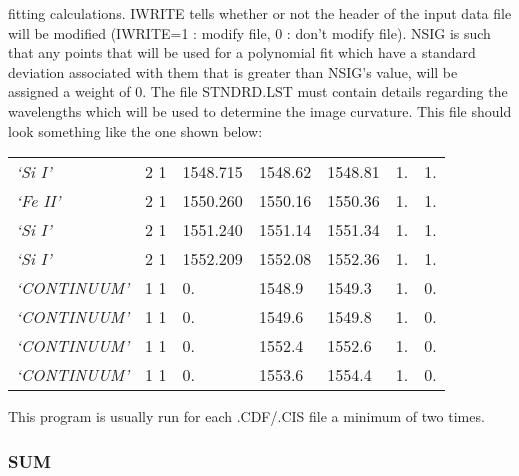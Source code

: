    fitting calculations.  IWRITE tells whether or not the header of the
   input data file will be modified (IWRITE=1 : modify file, 0 : don't
   modify file).  NSIG is such that any points that will be used for a
   polynomial fit which have a standard deviation associated with them
   that is greater than NSIG's value, will be assigned a weight of 0.
      The file STNDRD.LST must contain details regarding the wavelengths
   which will be used to determine the image curvature.  This file should
   look something like the one shown below:
\begin{center}
\begin{tabular}{||l l l l l l l||}
\hline
    {\em `Si I'}      &  2 1 & 1548.715 &  1548.62 &  1548.81 &   1.&   1. \\
    {\em `Fe II'}     &  2 1 & 1550.260 &  1550.16 &  1550.36 &   1.&   1. \\
    {\em `Si I'}      &  2 1 & 1551.240 &  1551.14 &  1551.34 &   1.&   1. \\
    {\em `Si I'}      &  2 1 & 1552.209 &  1552.08 &  1552.36 &   1.&   1. \\
    {\em `CONTINUUM'} &  1 1 &    0.    &  1548.9  &  1549.3  &   1.&   0. \\
    {\em `CONTINUUM'} &  1 1 &    0.    &  1549.6  &  1549.8  &   1.&   0. \\
    {\em `CONTINUUM'} &  1 1 &    0.    &  1552.4  &  1552.6  &   1.&   0. \\
    {\em `CONTINUUM'} &  1 1 &    0.    &  1553.6  &  1554.4  &   1.&   0. \\
\hline
\end{tabular}
\end{center}
      This program is usually run for each .CDF/.CIS file a minimum of two
   times.

\subsubsection{SUM}

